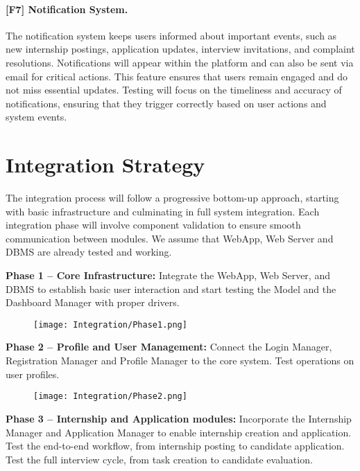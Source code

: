 \paragraph{[F7] Notification System.}  The notification system keeps users informed about important events, such as new internship postings, application updates, interview invitations, and complaint resolutions. Notifications will appear within the platform and can also be sent via email for critical actions. This feature ensures that users remain engaged and do not miss essential updates. Testing will focus on the timeliness and accuracy of notifications, ensuring that they trigger correctly based on user actions and system events.

\newpage
\section{Integration Strategy}
The integration process will follow a progressive bottom-up approach, starting with basic infrastructure and culminating in full system integration. Each integration phase will involve component validation to ensure smooth communication between modules. We assume that WebApp, Web Server and DBMS are already tested and working.

\textbf{Phase 1 – Core Infrastructure:} Integrate the WebApp, Web Server, and DBMS to establish basic user interaction and start testing the Model and the Dashboard Manager with proper drivers.

\begin{figure}[H]
    \begin{center}
        \texttt{[image: Integration/Phase1.png]}
        \label{fig:Integration_1}%
    \end{center}
\end{figure}

\textbf{Phase 2 – Profile and User Management:} Connect the Login Manager, Registration Manager and Profile Manager to the core system. Test operations on user profiles.

\begin{figure}[H]
    \begin{center}
        \texttt{[image: Integration/Phase2.png]}
        \label{fig:Integration_2}%
    \end{center}
\end{figure}

\textbf{Phase 3 – Internship and Application modules:} Incorporate the Internship Manager and Application Manager to enable internship creation and application. Test the end-to-end workflow, from internship posting to candidate application. Test the full interview cycle, from task creation to candidate evaluation.

